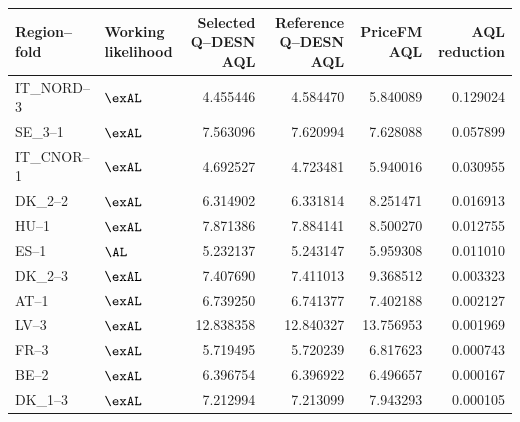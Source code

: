 \begingroup
\TableStyle
\scriptsize
\setlength{\tabcolsep}{4pt}
\begin{tabular}{@{}llrrrr@{}}
\toprule
Region--fold & Working likelihood & Selected Q--DESN AQL & Reference Q--DESN AQL & PriceFM AQL & AQL reduction \\
\midrule
IT\_NORD--3 & \(\exAL\) & 4.455446 & 4.584470 & 5.840089 & 0.129024 \\
SE\_3--1 & \(\exAL\) & 7.563096 & 7.620994 & 7.628088 & 0.057899 \\
IT\_CNOR--1 & \(\exAL\) & 4.692527 & 4.723481 & 5.940016 & 0.030955 \\
DK\_2--2 & \(\exAL\) & 6.314902 & 6.331814 & 8.251471 & 0.016913 \\
HU--1 & \(\exAL\) & 7.871386 & 7.884141 & 8.500270 & 0.012755 \\
ES--1 & \(\AL\) & 5.232137 & 5.243147 & 5.959308 & 0.011010 \\
DK\_2--3 & \(\exAL\) & 7.407690 & 7.411013 & 9.368512 & 0.003323 \\
AT--1 & \(\exAL\) & 6.739250 & 6.741377 & 7.402188 & 0.002127 \\
LV--3 & \(\exAL\) & 12.838358 & 12.840327 & 13.756953 & 0.001969 \\
FR--3 & \(\exAL\) & 5.719495 & 5.720239 & 6.817623 & 0.000743 \\
BE--2 & \(\exAL\) & 6.396754 & 6.396922 & 6.496657 & 0.000167 \\
DK\_1--3 & \(\exAL\) & 7.212994 & 7.213099 & 7.943293 & 0.000105 \\
\bottomrule
\end{tabular}
\endgroup
